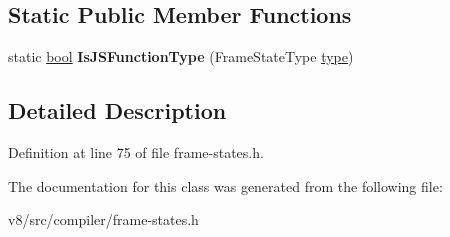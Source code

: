 \subsection*{Static Public Member Functions}
\begin{DoxyCompactItemize}
\item 
\mbox{\label{classv8_1_1internal_1_1compiler_1_1FrameStateFunctionInfo_a78154f20863a58417e547c83a32d0de2}} 
static \mbox{\hyperlink{classbool}{bool}} {\bfseries Is\+J\+S\+Function\+Type} (Frame\+State\+Type \mbox{\hyperlink{classstd_1_1conditional_1_1type}{type}})
\end{DoxyCompactItemize}


\subsection{Detailed Description}


Definition at line 75 of file frame-\/states.\+h.



The documentation for this class was generated from the following file\+:\begin{DoxyCompactItemize}
\item 
v8/src/compiler/frame-\/states.\+h\end{DoxyCompactItemize}
